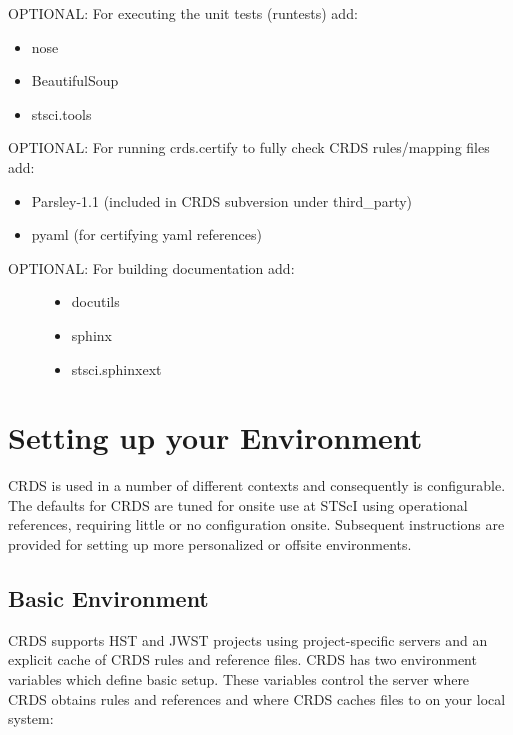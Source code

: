 \documentclass[letterpaper,10pt,english]{sphinxmanual}
\begin{document}
OPTIONAL: For executing the unit tests (runtests) add:
\begin{itemize}
\item {} 
nose

\item {} 
BeautifulSoup

\item {} 
stsci.tools

\end{itemize}

OPTIONAL: For running crds.certify to fully check CRDS rules/mapping files add:
\begin{itemize}
\item {} 
Parsley-1.1  (included in CRDS subversion under third\_party)

\item {} 
pyaml  (for certifying yaml references)

\end{itemize}
\begin{description}
\item[{OPTIONAL: For building documentation add:}] \leavevmode\begin{itemize}
\item {} 
docutils

\item {} 
sphinx

\item {} 
stsci.sphinxext

\end{itemize}

\end{description}


\chapter{Setting up your Environment}
\label{installation:setting-up-your-environment}
CRDS is used in a number of different contexts and consequently is configurable.   The defaults for
CRDS are tuned for onsite use at STScI using operational references,  requiring little or no configuration onsite.
Subsequent instructions are provided for setting up more personalized or offsite environments.


\section{Basic Environment}
\label{installation:basic-environment}
CRDS supports HST and JWST projects using project-specific servers and an explicit cache of CRDS rules and reference
files.   CRDS has two environment variables which define basic setup.   These variables control the server where CRDS
obtains rules and references and where CRDS caches files to on your local system:
\end{document}
